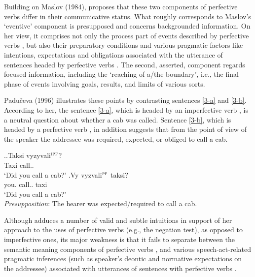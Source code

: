 Building on Maslov (1984), \citet{Paducheva:96, Paducheva:11} proposes that these two components of perfective verbs  differ in their communicative status. What roughly corresponds to Maslov's `eventive' component is presupposed and concerns backgrounded information. On her view, it comprises not only the process part of events described by perfective verbs , but also their preparatory conditions and various pragmatic factors like intentions, expectations and obligations associated with the utterance of sentences headed by perfective verbs . The second, asserted, component regards focused information, including the `reaching of a/the boundary', i.e., the final phase of events involving goals, results, and limits of various sorts. 

Padu\v{c}eva (1996) illustrates these points by contrasting sentences \ref{3-a} and \ref{3-b}. According to her, the sentence \ref{3-a}, which is headed by an imperfective verb , is a neutral question about whether a cab was called. Sentence \ref{3-b}, which is headed by a perfective verb , in addition suggests that from the point of view of the speaker the addressee was required, expected, or obliged to call a cab. 

\ex.\label{3}\ag.\label{3-a}Taksi vyzyvali$^{\textsc{ipf}}$?\\
Taxi call..\\
\trans `Did you call a cab?'
\bg.\label{3-b}Vy vyzvali$^{\textsc{pf}}$ taksi?\\
you. call.. taxi\\
\trans `Did you call a cab?'\\
\textit{Presupposition}: The hearer was expected/required to call a cab.\\

Although \citet{Paducheva:96} adduces a number of valid and subtle intuitions in support of her approach to the uses of perfective verbs  (e.g., the negation test), as opposed to imperfective ones, its major weakness is that it fails to separate between the semantic meaning components of perfective verbs ,  and various speech-act-related pragmatic inferences (such as speaker's deontic and normative expectations on the addressee) associated with utterances of sentences with perfective verbs . 
 
